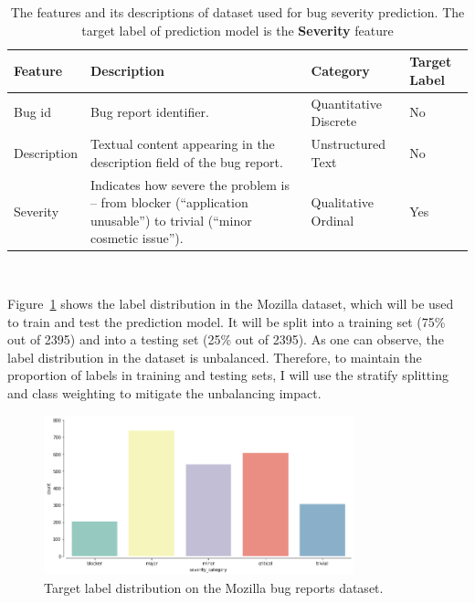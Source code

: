 \documentclass[a4paper]{article}
\begin{document}
\begin{table}[ht!]
    \centering
    \begin{tabular}{@{}p{}p{}p{}p{}@{}}
    \toprule
    {\bf Feature} & {\bf Description} & {\bf Category} & {\bf Target Label}\\
    \midrule
    Bug id                       & Bug report identifier.  & Quantitative Discrete & No\\
    \midrule
    Description                  & Textual content appearing in the description field of the bug report.                                                                               & Unstructured Text & No\\
    \midrule
    Severity                     & Indicates how severe the problem is – from blocker (``application unusable”) to trivial (``minor cosmetic issue”).                                & Qualitative Ordinal & Yes\\
    \bottomrule 
    \end{tabular}
    \caption{The features and its descriptions of dataset used for bug severity prediction. The target label of prediction model is the {\bf Severity} feature }\\
    \label{tab:features_descriptions}
\end{table}


\bigskip
Figure~\ref{fig:severity_class_distribution} shows the label distribution in the Mozilla dataset, which will be used to train and test the prediction model. It will be split into a training set (75\% out of 2395) and into a testing set (25\% out of 2395). As one can observe, the label distribution in the dataset is unbalanced. Therefore, to maintain the proportion of labels in training and testing sets, I will use the stratify splitting and class weighting\cite{procrastinator:2021} to mitigate the unbalancing impact.

\begin{figure}[ht!]
    \centering
    \includegraphics[width=0.8\textwidth]{figures/severity-labels-distribution.png}
    \caption{Target label distribution on the Mozilla bug reports dataset.}
    \label{fig:severity_class_distribution}
\end{figure}
\end{document}
